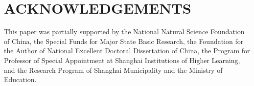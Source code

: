 \documentclass[aps,prb,twocolumn,showpacs,amsmath,amssymb]{revtex4-1}
\begin{document}
\section{ACKNOWLEDGEMENTS}
This paper was partially supported by the National Natural Science Foundation of China, the Special Funds for Major State Basic Research, the Foundation for the Author of National Excellent Doctoral Dissertation of China, the Program for Professor of Special Appointment at Shanghai Institutions of Higher Learning, and the Research Program of Shanghai Municipality and the Ministry of Education.



\end{document}
